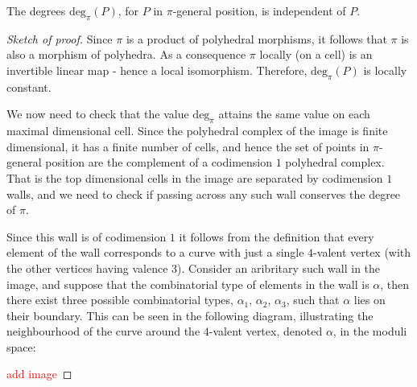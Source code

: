 \begin{proposition}
    The degrees $\text{deg}_{\pi}(P)$, for $P$ in $\pi$-general position, is independent of $P$.
\end{proposition}
\begin{proof}[Sketch of proof]
    Since $\pi$ is a product of polyhedral morphisms, it follows that $\pi$ is also a morphism of polyhedra.
    As a consequence $\pi$ locally (on a cell) is an invertible linear map - hence a local isomorphism. 
    Therefore, $\text{deg}_{\pi}(P)$ is locally constant.
    \par We now need to check that the value $\text{deg}_{\pi}$ attains the same value on each maximal dimensional cell. 
    Since the polyhedral complex of the image is finite dimensional, it has a finite number of cells, and hence the set of points in $\pi$-general position are the complement of a codimension $1$ polyhedral complex. 
    That is the top dimensional cells in the image are separated by codimension $1$ walls, and we need to check if passing across any such wall conserves the degree of $\pi$.
    \par Since this wall is of codimension $1$ it follows from the definition that every element of the wall corresponds to a curve with just a single $4$-valent vertex (with the other vertices having valence $3$). 
    Consider an aribritary such wall in the image, and suppose that the combinatorial type of elements in the wall is $\alpha$, then there exist three possible combinatorial types, $\alpha_{1},\, \alpha_{2},\,\alpha_{3}$, such that $\alpha$ lies on their boundary.
    This can be seen in the following diagram, illustrating the neighbourhood of the curve around the $4$-valent vertex, denoted $\alpha$, in the moduli space:
    \par \textcolor{red}{add image}


\end{proof}
